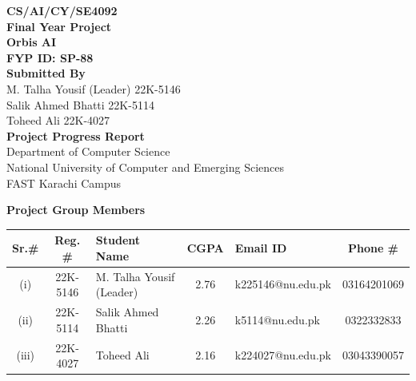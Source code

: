 \documentclass[12pt]{article}
\begin{document}
\begin{center}
    {\fontsize{16}{18}\selectfont \textbf{CS/AI/CY/SE4092}}\\[1.5em]

    {\fontsize{18}{20}\selectfont \textbf{Final Year Project}}\\[1em]

    {\fontsize{16}{18}\selectfont \textbf{Orbis AI}}\\[0.5em]
    {\fontsize{13}{15}\selectfont \textbf{FYP ID: SP-88}}\\[2em]

    {\fontsize{14}{16}\selectfont \textbf{Submitted By}}\\[1em]

    M. Talha Yousif (Leader) \hspace{1em} 22K-5146\\
    Salik Ahmed Bhatti \hspace{1em} 22K-5114\\
    Toheed Ali \hspace{1em} 22K-4027\\[2em]

    {\fontsize{16}{18}\selectfont \textbf{Project Progress Report}}\\[2em]

    Department of Computer Science\\
    National University of Computer and Emerging Sciences\\
    FAST Karachi Campus
\end{center}

\vspace{2em}

\begin{center}
\textbf{Project Group Members}
\end{center}

\vspace{0.5cm}

\begin{tabular}{|c|c|p{3.5cm}|c|p{3.5cm}|c|}
\hline
\textbf{Sr.\#} & \textbf{Reg. \#} & \textbf{Student Name} & \textbf{CGPA} & \textbf{Email ID} & \textbf{Phone \#} \\
\hline
(i) & 22K-5146 & M. Talha Yousif (Leader) & 2.76 & k225146@nu.edu.pk & 03164201069 \\[0.8cm]
\hline
(ii) & 22K-5114 & Salik Ahmed Bhatti & 2.26 & k5114@nu.edu.pk & 0322332833 \\[0.8cm]
\hline
(iii) & 22K-4027 & Toheed Ali & 2.16 & k224027@nu.edu.pk & 03043390057 \\[0.8cm]
\hline
\end{tabular}
\end{document}
